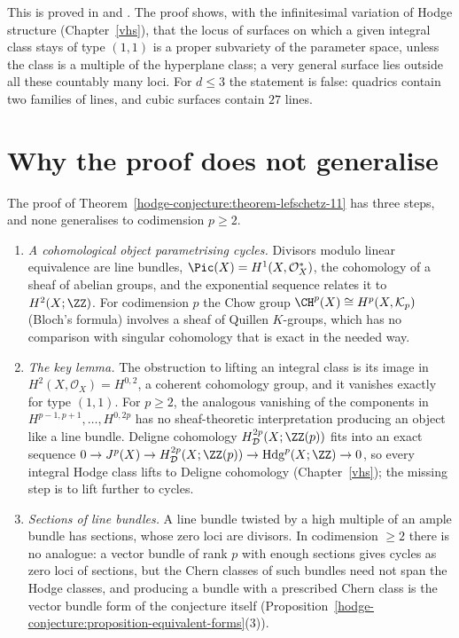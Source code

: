This is proved in \cite{voisin-hodge-2} and \cite{griffiths-harris-noether-lefschetz}. The proof shows, with the infinitesimal variation of Hodge structure (Chapter~\ref{vhs}), that
the locus of surfaces on which a given integral class stays of type $(1,1)$ is a proper subvariety of the parameter space, unless the class is a multiple of the hyperplane class; a
very general surface lies outside all these countably many loci. For $d \leq 3$ the statement is false: quadrics contain two families of lines, and cubic surfaces contain $27$ lines.

\section{Why the proof does not generalise}\label{hodge-conjecture:section-why-not}

\begin{remark}\label{hodge-conjecture:remark-why-not}
The proof of Theorem~\ref{hodge-conjecture:theorem-lefschetz-11} has three steps, and none generalises to codimension $p \geq 2$.
\begin{enumerate}
\item \emph{A cohomological object parametrising cycles.} Divisors modulo linear equivalence are line bundles, $\Pic(X) = H^1(X, \mathcal{O}_X^*)$, the cohomology of a sheaf of abelian
groups, and the exponential sequence relates it to $H^2(X; \ZZ)$. For codimension $p$ the Chow group $\CH^p(X) \cong H^p(X, \mathcal{K}_p)$ (Bloch's formula) involves a sheaf of Quillen
$K$-groups, which has no comparison with singular cohomology that is exact in the needed way.
\item \emph{The key lemma.} The obstruction to lifting an integral class is its image in $H^2(X, \mathcal{O}_X) = H^{0,2}$, a coherent cohomology group, and it vanishes exactly for type $(1,1)$. For
$p \geq 2$, the analogous vanishing of the components in $H^{p-1,p+1}, \ldots, H^{0,2p}$ has no sheaf-theoretic interpretation producing an object like a line bundle. Deligne cohomology
$H^{2p}_{\mathcal{D}}(X; \ZZ(p))$ fits into an exact sequence $0 \to J^p(X) \to H^{2p}_{\mathcal{D}}(X; \ZZ(p)) \to \mathrm{Hdg}^p(X; \ZZ) \to 0$, so every integral Hodge class lifts to Deligne
cohomology (Chapter~\ref{vhs}); the missing step is to lift further to cycles.
\item \emph{Sections of line bundles.} A line bundle twisted by a high multiple of an ample bundle has sections, whose zero loci are divisors. In codimension $\geq 2$ there is no
analogue: a vector bundle of rank $p$ with enough sections gives cycles as zero loci of sections, but the Chern classes of such bundles need not span the Hodge classes, and producing a
bundle with a prescribed Chern class is the vector bundle form of the conjecture itself (Proposition~\ref{hodge-conjecture:proposition-equivalent-forms}(3)).
\end{enumerate}
\end{remark}

